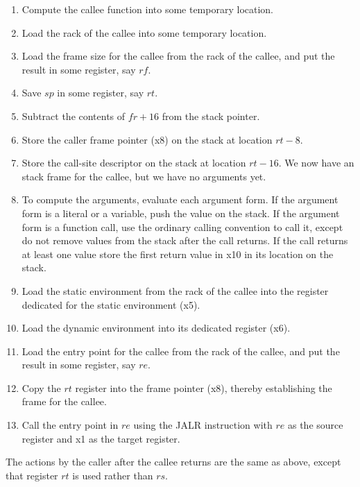 \begin{enumerate}
\item Compute the callee function into some temporary location.
\item Load the rack of the callee into some temporary location.
\item Load the frame size for the callee from the rack of the
  callee, and put the result in some register, say $rf$.
\item Save $sp$ in some register, say $rt$. 
\item Subtract the contents of $fr + 16$ from the stack pointer.
\item Store the caller frame pointer (x8) on the stack at location $rt
  - 8$.
\item Store the call-site descriptor on the stack at location $rt -
  16$.  We now have an stack frame for the callee, but we have
  no arguments yet.
\item To compute the arguments, evaluate each argument form.  If the
  argument form is a literal or a variable, push the value on the
  stack.  If the argument form is a function call, use the ordinary
  calling convention to call it, except do not remove values from the
  stack after the call returns.  If the call returns at least one
  value store the first return value in x10 in its location on the
  stack.
\item Load the static environment from the rack of the callee into the
  register dedicated for the static environment (x5).
\item Load the dynamic environment into its dedicated register (x6).
\item Load the entry point for the callee from the rack of the callee,
  and put the result in some register, say $re$.
\item Copy the $rt$ register into the frame pointer (x8), thereby
  establishing the frame for the callee.
\item Call the entry point in $re$ using the JALR instruction with
  $re$ as the source register and x1 as the target register.
\end{enumerate}

The actions by the caller after the callee returns are the same as
above, except that register $rt$ is used rather than $rs$.


